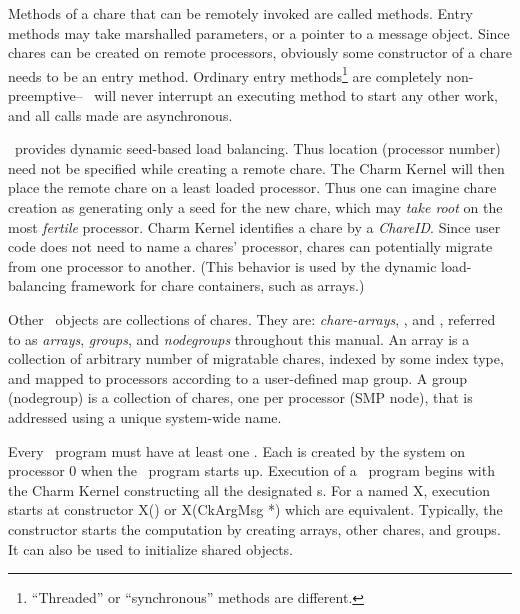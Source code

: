Methods of a chare that can be remotely invoked are called
 methods.  Entry methods may take marshalled
parameters, or a pointer to a message object.  Since chares can
be created on remote processors, obviously some constructor of a chare needs
to be an entry method.  Ordinary entry methods\footnote{``Threaded'' or
``synchronous'' methods are different.} are completely non-preemptive--
\charmpp\ will never interrupt an executing method to start any other work,
and all calls made are asynchronous.

\charmpp\ provides dynamic seed-based load balancing. Thus location (processor
number) need not be specified while creating a remote chare. The
Charm Kernel will then place the remote chare on a least loaded processor. Thus
one can imagine chare creation as generating only a seed for the new chare,
which may {\em take root} on the most {\em fertile} processor. Charm Kernel
identifies a chare by a {\em ChareID}.  Since user code does not
need to name a chares' processor, chares can potentially migrate from one
processor to another.  (This behavior is used by the dynamic load-balancing
framework for chare containers, such as arrays.)

Other \charmpp\ objects are collections of chares. They are: {\em
chare-arrays}, , and , referred to as {\em arrays}, {\em groups}, and {\em
nodegroups} throughout this manual. An array is a collection of arbitrary
number of migratable chares, indexed by some index type, and mapped to
processors according to a user-defined map group. A group (nodegroup) is a
collection of chares, one per processor (SMP node), that is addressed using
a unique system-wide name.

Every \charmpp\ program must have at least one .  Each
 is created by the system on processor 0 when the \charmpp\
program starts up.  Execution of a \charmpp\ program begins with the Charm
Kernel constructing all the designated s.  For a \kw{mainchare} named X, execution starts at constructor X() or X(CkArgMsg *) which are equivalent.
Typically, the
 constructor starts the computation by creating arrays, other
chares, and groups.  It can also be used to initialize shared \kw{readonly}
objects.

